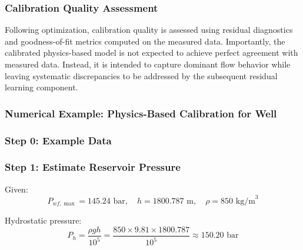 \documentclass[12pt,APA]{uomthesis}
\begin{document}
\subsubsection{Calibration Quality Assessment}
Following optimization, calibration quality is assessed using residual diagnostics and goodness-of-fit metrics computed on the measured data.
Importantly, the calibrated physics-based model is not expected to achieve perfect agreement with measured data. Instead, it is intended to capture dominant flow behavior while leaving systematic discrepancies to be addressed by the subsequent residual learning component.

\subsubsection{Numerical Example: Physics-Based Calibration for Well}
\subsubsection*{Step 0: Example Data}
\begin{table}[!htb]
\end{table}


\subsubsection*{Step 1: Estimate Reservoir Pressure}
Given:
\[
P_{wf,\max} = 145.24 \text{ bar}, \quad h = 1800.787 \text{ m}, \quad \rho = 850 \text{ kg/m}^3
\]

Hydrostatic pressure:
\[
P_h = \frac{\rho g h}{10^5}
= \frac{850 \times 9.81 \times 1800.787}{10^5}
\approx 150.20 \text{ bar}
\]
\end{document}
